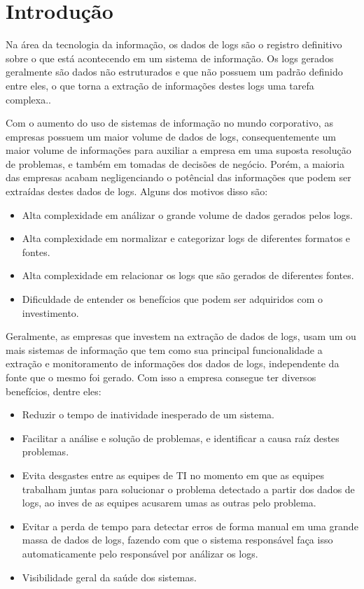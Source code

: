 \chapter{Introdução} \label{cap:introducao}
Na área da tecnologia da informação, os dados de logs são o registro definitivo sobre o que está acontecendo em um sistema de informação. Os logs gerados geralmente são dados não estruturados e que não possuem um padrão definido entre eles, o que torna a extração de informações destes logs uma tarefa complexa.. \par 

Com o aumento do uso de sistemas de informação no mundo corporativo, as empresas possuem um maior volume de dados de logs, consequentemente um maior volume de informações para auxiliar a empresa em uma suposta resolução de problemas, e também em tomadas de decisões de negócio. Porém, a maioria das empresas acabam negligenciando o potêncial das informações que podem ser extraídas destes dados de logs. Alguns dos motivos disso são:

\begin{itemize}
\item Alta complexidade em análizar o grande volume de dados gerados pelos logs.
\item Alta complexidade em normalizar e categorizar logs de diferentes formatos e fontes.
\item Alta complexidade em relacionar os logs que são gerados de diferentes fontes.
\item Dificuldade de entender os benefícios que podem ser adquiridos com o investimento.
\end{itemize}

Geralmente, as empresas que investem na extração de dados de logs, usam um ou mais sistemas de informação que tem como sua principal funcionalidade a extração e monitoramento de informações dos dados de logs, independente da fonte que o mesmo foi gerado. Com isso a empresa consegue ter diversos benefícios, dentre eles: 

\begin{itemize}
\item Reduzir o tempo de inatividade inesperado de um sistema.
\item Facilitar a análise e solução de problemas, e identificar a causa raíz destes problemas.
\item Evita desgastes entre as equipes de TI no momento em que as equipes trabalham juntas para solucionar o problema detectado a partir dos dados de logs, ao inves de as equipes acusarem umas as outras pelo problema.
\item Evitar a perda de tempo para detectar erros de forma manual em uma grande massa de dados de logs, fazendo com que o sistema responsável faça isso automaticamente pelo responsável por análizar os logs.
\item Visibilidade geral da saúde dos sistemas.
\end{itemize}

